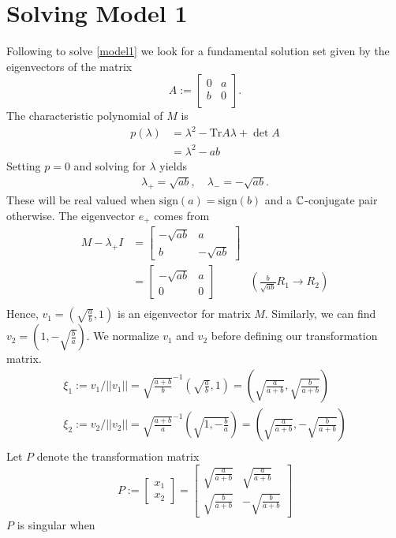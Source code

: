 \documentclass[12pt]{article}
\begin{document}
\section{Solving Model 1}
Following \cite[Chap. 7~]{boyce2013elementary} to solve \ref{model1} we look for a fundamental solution set given by the eigenvectors of the matrix 
\begin{equation}
  A := \begin{bmatrix}
    0 & a \\
    b & 0 \\
  \end{bmatrix}.
\end{equation}
The characteristic polynomial of $M$ is 
\begin{eqnarray}
  p(\lambda) &= \lambda^2 - \text{Tr} A \lambda + \det{A}\\
	     &= \lambda^2 - ab
\end{eqnarray}
Setting $p=0$ and solving for $\lambda$ yields
\begin{align}
  \lambda_+ = \sqrt{ab},\quad \lambda_- = -\sqrt{ab}.
\end{align}
These will be real valued when $\text{sign}(a)=\text{sign}(b)$ and a $\mathbb{C}$-conjugate pair otherwise. The eigenvector $e_+$ comes from
\begin{align*}
  M-\lambda_+ I &= 
    \begin{bmatrix}
      -\sqrt{ab} & a \\
      b  & -\sqrt{ab}
    \end{bmatrix} & \\
   &= \begin{bmatrix}-\sqrt{ab}&a\\0&0\end{bmatrix} & \left(\frac{b}{\sqrt{ab}}R_1 \to R_2\right)\\
\end{align*}
Hence, $v_1 = \left(\sqrt{\frac{a}{b}},1\right)$ is an eigenvector for matrix $M$. Similarly, we can find $v_2 = \left(1,-\sqrt{\frac{b}{a}}\right)$. We normalize $v_1$ and $v_2$ before defining our transformation matrix.
\begin{align*}
  \xi_1:=v_1/||v_1||=\sqrt{\frac{a+b}{b}}^{-1}\left(\sqrt{\frac{a}{b}},1\right)=\left(\sqrt{\frac{a}{a+b}},\sqrt{\frac{b}{a+b}}\right)\\
  \xi_2:=v_2/||v_2||=\sqrt{\frac{a+b}{a}}^{-1}\left(\sqrt{1,-\frac{b}{a}}\right)=\left(\sqrt{\frac{a}{a+b}},-\sqrt{\frac{b}{a+b}}\right)\\
\end{align*}
Let $P$ denote the transformation matrix
\begin{equation*}
  P:=\begin{bmatrix}x_1\\x_2\end{bmatrix}=\begin{bmatrix}\sqrt{\frac{a}{a+b}} & \sqrt{\frac{a}{a+b}}\\
  \sqrt{\frac{b}{a+b}} & -\sqrt{\frac{b}{a+b}}
\end{bmatrix}
\end{equation*}
$P$ is singular when 
\end{document}
